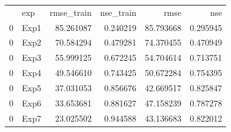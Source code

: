 \begin{tabular}{llrrrr}
 & exp & rmse_train & nse_train & rmse & nse \\
0 & Exp1 & 85.261087 & 0.240219 & 85.793668 & 0.295945 \\
0 & Exp2 & 70.584294 & 0.479281 & 74.370455 & 0.470949 \\
0 & Exp3 & 55.999125 & 0.672245 & 54.704614 & 0.713751 \\
0 & Exp4 & 49.546610 & 0.743425 & 50.672284 & 0.754395 \\
0 & Exp5 & 37.031053 & 0.856676 & 42.669517 & 0.825847 \\
0 & Exp6 & 33.653681 & 0.881627 & 47.158239 & 0.787278 \\
0 & Exp7 & 23.025502 & 0.944588 & 43.136683 & 0.822012 \\
\end{tabular}
